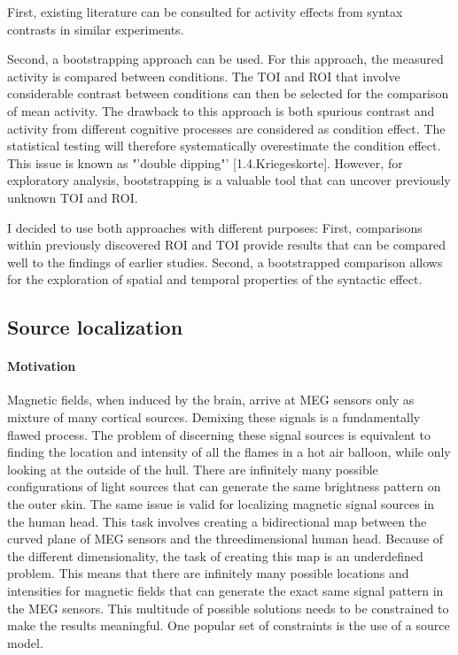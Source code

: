 First, existing literature can be consulted for activity effects from syntax contrasts in similar experiments.

Second, a bootstrapping approach can be used.
For this approach, the measured activity is compared between conditions.
The TOI and ROI that involve considerable contrast between conditions can then be selected for the comparison of mean activity.
The drawback to this approach is both spurious contrast and activity from different cognitive processes are considered as condition effect.
The statistical testing will therefore systematically overestimate the condition effect.
This issue is known as "'double dipping"' [1.4.Kriegeskorte].
However, for exploratory analysis, bootstrapping is a valuable tool that can uncover previously unknown TOI and ROI.

I decided to use both approaches with different purposes:
First, comparisons within previously discovered ROI and TOI provide results that can be compared well to the findings of earlier studies.
Second, a bootstrapped comparison allows for the exploration of spatial and temporal properties of the syntactic effect.

\subsection{Source localization}

\paragraph{Motivation}
Magnetic fields, when induced by the brain, arrive at MEG sensors only as mixture of many cortical sources.
Demixing these signals is a fundamentally flawed process.
The problem of discerning these signal sources is equivalent to finding the location and intensity of all the flames in a hot air balloon, while only looking at the outside of the hull.
There are infinitely many possible configurations of light sources that can generate the same brightness pattern on the outer skin.
The same issue is valid for localizing magnetic signal sources in the human head.
This task involves creating a bidirectional map between the curved plane of MEG sensors and the threedimensional human head.
Because of the different dimensionality, the task of creating this map is an underdefined problem.
This means that there are infinitely many possible locations and intensities for magnetic fields that can generate the exact same signal pattern in the MEG sensors.
This multitude of possible solutions needs to be constrained to make the results meaningful.
One popular set of constraints is the use of a source model.

